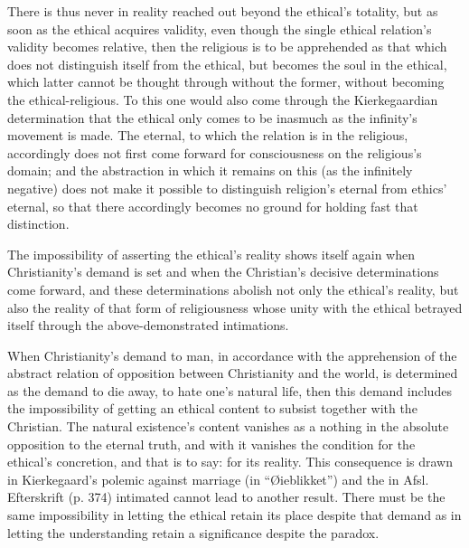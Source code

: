 \documentclass[12pt,a4paper]{book}
\begin{document}
There is thus never in reality reached out beyond the ethical's totality, but as soon as the ethical acquires
validity, even though the single ethical relation's validity becomes relative, then the religious is to be
apprehended as that which does not distinguish itself from the ethical, but becomes the soul in the ethical,
which latter cannot be thought through without the former, without becoming the ethical-religious. To this one
would also come through the Kierkegaardian determination that the ethical only comes to be inasmuch as the
infinity's movement is made. The eternal, to which the relation is in the religious, accordingly does not first
come forward for consciousness on the religious's domain; and the abstraction in which it remains on this (as the
infinitely negative) does not make it possible to distinguish religion's eternal from ethics' eternal, so that
there accordingly becomes no ground for holding fast that distinction.

The impossibility of asserting the ethical's reality shows itself again when Christianity's demand is set and when
the Christian's decisive determinations come forward, and these determinations abolish not only the ethical's
reality, but also the reality of that form of religiousness whose unity with the ethical betrayed itself through
the above-demonstrated intimations.

When Christianity's demand to man, in accordance with the apprehension of the abstract relation of opposition
between Christianity and the world, is determined as the demand to die away, to hate one's natural life, then this
demand includes the impossibility of getting an ethical content to subsist together with the Christian. The
natural existence's content vanishes as a nothing in the absolute opposition to the eternal truth, and with it
vanishes the condition for the ethical's concretion, and that is to say: for its reality. This consequence is
drawn in Kierkegaard's polemic against marriage (in ``Øieblikket'') and the in Afsl. Efterskrift (p. 374)
intimated cannot lead to another result. There must be the same impossibility in letting the ethical retain its
place despite that demand as in letting the understanding retain a significance despite the paradox.
\end{document}
